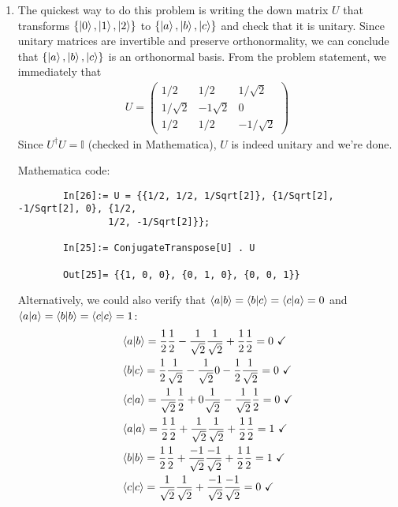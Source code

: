 \documentclass{article}
\theoremstyle{definition}
\newcommand{\f}[2]{\frac{#1}{#2}}
\begin{document}
\begin{enumerate}[label=(\alph*)]
	\item The quickest way to do this problem is writing the down matrix $U$ that transforms $\{\ket{0},\ket{1},\ket{2}\}$ to $\{\ket{a},\ket{b}, \ket{c}\}$ and check that it is unitary. Since unitary matrices are invertible and preserve orthonormality, we can conclude that $\{\ket{a},\ket{b}, \ket{c}\}$ is an orthonormal basis. From the problem statement, we immediately that 
	\begin{align*}
		U = \begin{pmatrix}
			1/2 & 1/2 & 1/\sqrt{2} \\
			1/\sqrt{2} & -1\sqrt{2} & 0 \\
			1/2 & 1/2 & -1/\sqrt{2}
		\end{pmatrix}
	\end{align*}
	Since $U^\dagger U = \mathbb{I}$ (checked in Mathematica), $U$ is indeed unitary and we're done. 
	
	
	
	Mathematica code:
	\begin{lstlisting}
		In[26]:= U = {{1/2, 1/2, 1/Sqrt[2]}, {1/Sqrt[2], -1/Sqrt[2], 0}, {1/2,
				1/2, -1/Sqrt[2]}};
		
		In[25]:= ConjugateTranspose[U] . U
		
		Out[25]= {{1, 0, 0}, {0, 1, 0}, {0, 0, 1}}
	\end{lstlisting}
	
	Alternatively, we could also verify that $\bra{a}\ket{b}= \bra{b}\ket{c}= \bra{c}\ket{a}=0$ and $\braket{a} = \braket{b} = \braket{c} = 1$:
	\begin{align*}
		&\bra{a}\ket{b} = \f{1}{2}\f{1}{2} - \f{1}{\sqrt{2}} \f{1}{\sqrt{2}} + \f{1}{2}\f{1}{2} = 0 \,\,\checkmark\\
		&\bra{b}\ket{c} = \f{1}{2}\f{1}{\sqrt{2}} - \f{1}{\sqrt{2}} 0 - \f{1}{2}\f{1}{\sqrt{2}} = 0 \,\,\checkmark \\
		&\bra{c}\ket{a} = \f{1}{\sqrt{2}}\f{1}{2} + 0 \f{1}{\sqrt{2}} - \f{1}{\sqrt{2}} \f{1}{2} = 0 \,\,\checkmark\\
		&\braket{a} = \f{1}{2}\f{1}{2} + \f{1}{\sqrt{2}} \f{1}{\sqrt{2}} + \f{1}{2}\f{1}{2} = 1 \,\,\checkmark\\
		&\braket{b} = \f{1}{2}\f{1}{2} + \f{-1}{\sqrt{2}} \f{-1}{\sqrt{2}} + \f{1}{2}\f{1}{2} = 1 \,\,\checkmark\\
		&\braket{c} = \f{1}{\sqrt{2}} \f{1}{\sqrt{2}} + \f{-1}{\sqrt{2}} \f{-1}{\sqrt{2}} = 0\,\,\checkmark 
	\end{align*}
	

\end{enumerate}
\end{document}
